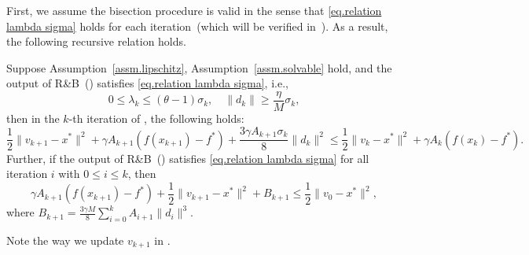 \documentclass[moor,sglanonrev]{informs4}
\begin{document}
First, we assume the bisection procedure is valid in the sense that \eqref{eq.relation lambda sigma} holds for each iteration~(which will be verified in~).
As a result, the following recursive relation holds.
\begin{lemma}\label{lem.ms estimate}
    Suppose Assumption~\ref{assm.lipschitz}, Assumption~\ref{assm.solvable} hold, and the output of \textnormal{R\&B}~() satisfies \eqref{eq.relation lambda sigma}, i.e.,
    \begin{equation*}
        0\leq\lambda_k\leq (\theta-1)\sigma_k, \quad \|d_k\|\geq \frac{\eta}{M}\sigma_k,
    \end{equation*}
    then in the $k$-th iteration of , the following holds:
    \begin{equation}
        \label{eq.helper bounded x}
        \frac{1}{2}\|v_{k+1}-x^* \|^2 +\gamma A_{k+1}\left(f(x_{k+1})-f^*\right)+ \frac{3\gamma A_{k+1}\sigma_k}{8}\|d_k\|^2 \leq \frac{1}{2}\|v_k-x^*\|^2 +\gamma A_k \left (f(x_k)-f^*\right).
    \end{equation}
    Further, if the output of \textnormal{R\&B}~() satisfies \eqref{eq.relation lambda sigma} for all iteration $i$ with $0\leq i\leq k$, then
    \begin{equation}
        \label{eq.ms estimate advanced}
        \gamma A_{k+1}\left (f(x_{k+1})-f^* \right) + \frac{1}{2}\|v_{k+1}-x^*\|^2 +B_{k+1} \leq \frac{1}{2}\|v_0-x^*\|^2,
    \end{equation}
    where $B_{k+1} = \frac{3\gamma M}{8}\sum_{i=0}^{k}A_{i+1}\|d_i\|^3.$
\end{lemma}
Note the way we update $v_{k+1}$ in .
\end{document}
